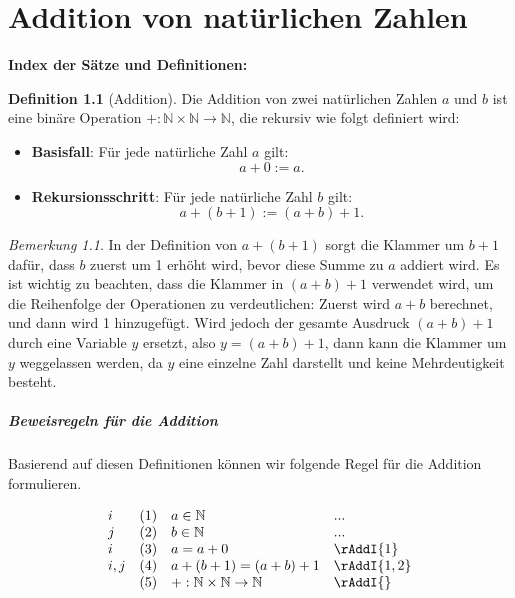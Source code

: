 \documentclass{book}
\theoremstyle{plain}
\theoremstyle{remark}
\newtheorem*{remark}{Bemerkung}
\theoremstyle{definition}
\newtheorem{definition}{Definition}[section]
\begin{document}
\chapter{Addition von natürlichen Zahlen}

\textbf{Index der Sätze und Definitionen:}


\begin{definition}[Addition]
    Die Addition von zwei natürlichen Zahlen \( a \) und \( b \) ist eine binäre Operation \( +: \mathbb{N} \times \mathbb{N} \to \mathbb{N} \), die rekursiv wie folgt definiert wird:
    
    \begin{itemize}
        \item \textbf{Basisfall}: Für jede natürliche Zahl \( a \) gilt:
        \[
        a + 0 := a.
        \]
        
        \item \textbf{Rekursionsschritt}: Für jede natürliche Zahl \( b \) gilt:
        \[
        a + (b+1) := (a + b) + 1.
        \]
    \end{itemize}
\end{definition}

\begin{remark}
In der Definition von \( a + (b+1) \) sorgt die Klammer um \( b+1 \) dafür, dass \( b \) zuerst um 1 erhöht wird, bevor diese Summe zu \( a \) addiert wird. Es ist wichtig zu beachten, dass die Klammer in \( (a + b) + 1 \) verwendet wird, um die Reihenfolge der Operationen zu verdeutlichen: Zuerst wird \( a + b \) berechnet, und dann wird 1 hinzugefügt. Wird jedoch der gesamte Ausdruck \( (a + b) + 1 \) durch eine Variable \( y \) ersetzt, also \( y = (a + b) + 1 \), dann kann die Klammer um \( y \) weggelassen werden, da \( y \) eine einzelne Zahl darstellt und keine Mehrdeutigkeit besteht.
\end{remark}

\paragraph{Beweisregeln für die Addition}
\label{rule:rAddI} 
Basierend auf diesen Definitionen können wir folgende Regel für die Addition formulieren. 

\[
\begin{array}{llll}
	i & (1) & a \in \mathbb{N} & ... \\
	j & (2) & b \in \mathbb{N} & ... \\
        i & (3) & a = a + 0 & \rAddI{1} \\
	i,j & (4) & a + (b+1) = (a+b)+1 & \rAddI{1,2} \\
            & (5) & +:\mathbb{N}\times\mathbb{N}\rightarrow\mathbb{N} & \rAddI{} \\
\end{array}
\]
\end{document}
